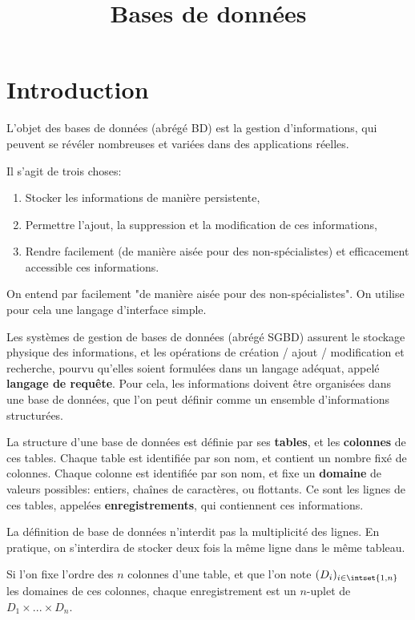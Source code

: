 \documentclass{scrartcl}
\title{Bases de données}
\author{}
\date{}
\begin{document}
	\maketitle
	\section{Introduction}
		L'objet des bases de données (abrégé BD) est la gestion d'informations,
		qui peuvent se révéler nombreuses et variées dans des applications réelles.

		Il s'agit de trois choses:
		\begin{enumerate}
			\item Stocker les informations de manière persistente,
			\item Permettre l'ajout, la suppression et la modification de ces informations,
			\item Rendre facilement (de manière aisée pour des non-spécialistes) et efficacement accessible ces informations.
		\end{enumerate}

		On entend par facilement "de manière aisée pour des non-spécialistes". 
		On utilise pour cela une langage d'interface simple.

		Les systèmes de gestion de bases de données (abrégé SGBD) assurent le stockage physique des informations,
		et les opérations de création / ajout / modification et recherche, 
		pourvu qu'elles soient formulées dans un langage adéquat, appelé \textbf{langage de requête}.
		Pour cela, les informations doivent être organisées dans une base de données, 
		que l'on peut définir comme un ensemble d'informations structurées.

		La structure d'une base de données est définie par ses \textbf{tables}, et les \textbf{colonnes} de ces tables.
		Chaque table est identifiée par son nom, et contient un nombre fixé de colonnes.
		Chaque colonne est identifiée par son nom, et fixe un \textbf{domaine} de valeurs possibles:
		entiers, chaînes de caractères, ou flottants.
		Ce sont les lignes de ces tables, appelées \textbf{enregistrements}, qui contiennent ces informations.

		\rem La définition de base de données n'interdit pas la multiplicité des lignes. 
		En pratique, on s'interdira de stocker deux fois la même ligne dans le même tableau.

		Si l'on fixe l'ordre des $n$ colonnes d'une table, et que l'on note 
		$(D_i)_{i\in\intset{1,n}}$ les domaines de ces colonnes, chaque enregistrement est un $n$-uplet
		de $D_1\times...\times D_n$.
\end{document}

